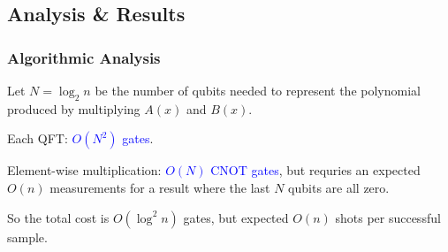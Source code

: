 \documentclass[
	11pt, %
]{beamer}
\begin{document}

\subsection{Analysis \& Results}
\begin{frame}
    \frametitle{Algorithmic Analysis}
    Let $N = \log_2 n$ be the number of qubits needed to represent the polynomial 
    produced by multiplying $A(x)$ and $B(x)$.

    \bigskip
    Each QFT: \textcolor{blue}{$O(N^2)$ gates}.

    \bigskip
    Element-wise multiplication: \textcolor{blue}{$O(N)$ CNOT gates}, 
    but requries an expected $O(n)$ measurements for a result where 
    the last $N$ qubits are all zero.

    \bigskip
    So the total cost is $O(\log^2 n)$ gates, but expected $O(n)$ shots per successful sample.
\end{frame}

\end{document}
